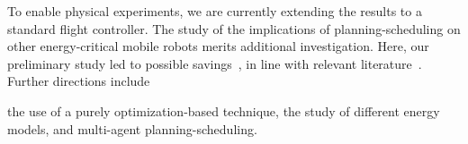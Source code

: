 \documentclass[letterpaper,10pt,conference,twoside]{IEEEtran}
\theoremstyle{definition}
\begin{document}
{\color{black}To enable physical experiments}, we are currently extending the results to a standard flight controller. %
The study of the implications of planning-scheduling on other energy-critical mobile robots {\color{black}merits additional investigation}. Here, our preliminary study led to possible savings~\cite{seewald2020beyond}, in line with relevant literature~\cite{ondruska2015scheduled,lahijanian2018resource}.
Further directions include {\color{black}the use of a purely optimization-based technique, %
the study of different energy models, and multi-agent planning-scheduling.%


{\small  %
}             %
%  
                                    





}
\end{document}
